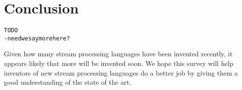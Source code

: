 \section{Conclusion}\label{sec:conclusion}

\begin{alltt}TODO\scriptsize
- need we say more here?
\end{alltt}

Given how many stream processing languages have been invented recently, it appears likely that more will be invented soon. We hope this survey will help inventors of new stream processing languages do a better job by giving them a good understanding of the state of the art.


